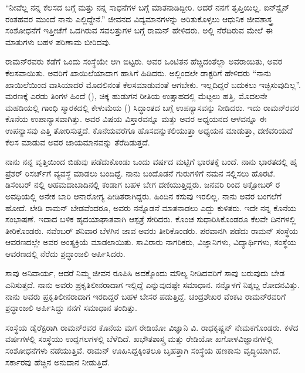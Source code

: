  “ನೀವೆಲ್ಲ ನನ್ನ ಕೆಲಸದ ಬಗ್ಗೆ ಮತ್ತು ನನ್ನ ಸಾಧನೆಗಳ ಬಗ್ಗೆ ಮಾತನಾಡಿದ್ದೀರಿ. ಆದರೆ ನನಗೆ ತೃಪ್ತಿಯಿಲ್ಲ. ಐನ್‍ಸ್ಟೈನ್ ರಂತಹವರ ಮುಂದೆ ನಾನು ಎಲ್ಲಿದ್ದೇನೆ.” ಜೀವನದ ವಿದ್ಯಮಾನಗಳನ್ನು ಅರಿತುಕೊಳ್ಳಲು ಆಧುನಿಕ ಜೀವಶಾಸ್ತ್ರ ಸಂಶೋಧನೆಗೆ ಇತ್ತೀಚೆಗೆ ಒದಗಿರುವ ಸವಲತ್ತುಗಳ ಬಗ್ಗೆ ರಾಮನ್ ಹೇಳಿದರು. ಅಲ್ಲಿ ನೆರೆದಿರುವ ಮೇಲೆ ಈ ಮಾತುಗಳು ಬಹಳ ಪರಿಣಾಮ ಬೀರಿದವು.

ರಾಮನ್‍ರವರು ಕಡೆಗೆ ಒಂದು ಸಂಸ್ಥೆಯೇ ಆಗಿ ಬಿಟ್ಟರು. ಅವರ ಒಂಟಿತನ ಹೆಚ್ಚಿದಂತೆಲ್ಲಾ ಅವರಾಯಿತು, ಅವರ ಕೆಲಸವಾಯಿತು. ಅವರಿಗೆ ಖಾಯಿಲೆಯಾದಾಗ ಹಾಸಿಗೆ ಹಿಡಿದರು. ಅಲ್ಲಿಂದಲೇ ಡಾಕ್ಟರಿಗೆ ಹೇಳಿದರು\enginline{-} “ನಾನು ಖಾಯಿಲೆಯಿಂದ ವಾಸಿಯಾದರೆ ಮೊದಲಿನಂತೆ ಕೆಲಸಮಾಡುವಂತೆ ಆಗಬೇಕು. ಇಲ್ಲದಿದ್ದರೆ ಬದುಕಲು ಇಚ್ಛಿಸುವುದಿಲ್ಲ”. ಮರಣಕ್ಕೆ ಎರಡು ತಿಂಗಳ ಹಿಂದೆ (), ಚಿಕ್ಕ ಹುಡುಗನ ರೀತಿಯ ಉತ್ಸಾಹದಲ್ಲಿ ಮೆಟ್ಟಲು ಹತ್ತಿ, ಮೊದಲನೇ ಮಹಡಿಯಲ್ಲಿ ಗಾಂಧಿ ಸ್ಮಾರಕದಲ್ಲಿ ಕೇಳುಮೆಯ () ಸಿದ್ಧಾಂತದ ಬಗ್ಗೆ ಉಪನ್ಯಾಸವನ್ನು ನೀಡಿದರು. ಇದು ರಾಮನ್‍ರವರ ಕೊನೆಯ ಉಪಾನ್ಯಾಸವಾಗಿತ್ತು. ಅವರ ವಿಷಯ ವಿಸ್ತಾರವನ್ನೂ ಮತ್ತು ಅವರ ಅಧ್ಯಯನದ ಆಳವನ್ನೂ ಈ ಉಪನ್ಯಾಸವು ಎತ್ತಿ ತೋರಿಸುತ್ತದೆ. ಕೊನೆಯವರೆಗೂ ಹೊಸದನ್ನು\break ಕಲಿಯುತ್ತಾ ಅಧ್ಯಯನ ಮಾಡುತ್ತಾ, ದಣಿವರಿಯದೆ ಕೆಲಸ ಮಾಡುವ ಅವರ ಜಾಯಮಾನವನ್ನು ತೆರೆದಿಡುತ್ತದೆ.

ನಾನು ನನ್ನ ವೃತ್ತಿಯಿಂದ ಬಿಡುವು ಪಡೆದುಕೊಂಡು ಒಂದು ವರ್ಷದ ಮಟ್ಟಿಗೆ ಭಾರತಕ್ಕೆ ಬಂದೆ. ನಾನು ಭಾರತದಲ್ಲಿ ಹೈ ಪ್ರೆಶರ್ ರಿಸರ್ಚ್‌ಗೆ ವ್ಯವಸ್ಥೆ ಮಾಡಲು ಬಂದಿದ್ದೆ. ನಾನು ಬಂದೊಡನೆ ಗುರುಗಳಿಗೆ ನಮನ ಸಲ್ಲಿಸಲು ಹೊರಟೆ.  ಡಿಸೆಂಬರ್ ನಲ್ಲಿ ಅಹಮದಾಬಾದಿನಲ್ಲಿ ಕಂಡಾಗ ಬಹಳ ಬೇಗ ದಣಿಯುತ್ತಿದ್ದರು. ಜನವರಿ  ರಿಂದ ಅಕ್ಟೋಬರ್  ರ ಅವಧಿಯಲ್ಲಿ ಅನೇಕ ಬಾರಿ ಆನಾರೋಗ್ಯ ಪೀಡಿತರಾಗಿದ್ದರು. ಹಿಂದಿನ ಕಸುವು ಇರಲಿಲ್ಲ. ನಾನು ಅವರ ಬಂಗಲೆಗೆ ಹೋದೆ. ಲೇಡಿ ರಾಮನ್ ಬೇಡವೆಂದರೂ, ಅವರು ನನ್ನೊಡನೆ ಮಾತನಾಡಲು ಎದ್ದು ಕುಳಿತರು. ಇದೇ ನನ್ನ ಕೊನೆಯ ಸಂಭಾಷಣೆ. ಇದಾದ ಬಳಿಕ ಹೃದಯಾಘಾತವಾಗಿ ಆಸ್ಪತ್ರೆ ಸೇರಿದರು. ಕೊಂಚ ಸುಧಾರಿಸಿಕೊಂಡರೂ ಕೆಲವೇ ದಿನಗಳಲ್ಲಿ ತೀರಿಕೊಂಡರು. ನವೆಂಬರ್  ಶನಿವಾರ ಬೆಳಗಿನ ಜಾವ ಅವರು ತೀರಿಕೊಂಡರು. ಪರವಾನಗಿ ಪಡೆದು ರಾಮನ್ ಸಂಸ್ಥೆಯ ಆವರಣದಲ್ಲೇ ಅವರ ಅಂತ್ಯಕ್ರಿಯೆ ಮಾಡಲಾಯಿತು. ಸಾವಿರಾರು ನಾಗರಿಕರು, ವಿಜ್ಞಾನಿಗಳು, ವಿದ್ಯಾರ್ಥಿಗಳು, ಸಂಸ್ಥೆಯ ಆವರಣದಲ್ಲಿ ನೆರೆದು ಶ್ರದ್ಧಾಂಜಲಿ ಅರ್ಪಿಸಿದರು.

ಸಾವು ಅನಿವಾರ್ಯ, ಆದರೆ ನಿಮ್ಮ ಜೀವನ ರೂಪಿಸಿ ಅದಕ್ಕೊಂದು ಮೌಲ್ಯ ನೀಡಿದವರಿಗೆ ಸಾವು ಬರುವುದು ಬೇಡ ಎನಿಸುತ್ತದೆ. ನಾನು ಅವರು ಪ್ರಕೃತಿಲೀನರಾದಾಗ ಇಲ್ಲಿದ್ದೆ ಎನ್ನುವುದಷ್ಟೇ ಸಮಾಧಾನ. ನನ್ನೊಳಗೆ ನಿಶ್ಶಬ್ದ ರೋದನವಿತ್ತು. ನಾನು ಅವರು ಪ್ರಕೃತಿಲೀನರಾದಾಗ ಇರದಿದ್ದರೆ ಬಹಳ ಬೇಸರ ಪಡುತ್ತಿದ್ದೆ. ಚಂದ್ರಶೇಖರ ವೆಂಕಟ ರಾಮನ್‍ರವರಿಗೆ ಶ್ರದ್ಧಾಂಜಲಿ ಅರ್ಪಿಸಿದ್ದು ನನಗೆ ಸಮಾಧಾನ ತಂದಿತ್ತು.

ಸಂಸ್ಥೆಯ ಡೈರೆಕ್ಟರಾಗಿ ರಾಮನ್‍ರವರ ಕೊನೆಯ ಮಗ ರೇಡಿಯೋ ವಿಜ್ಞಾನಿ ವಿ. ರಾಧಕೃಷ್ಣನ್ ನೇಮಕಗೊಂಡರು. ಕಳೆದ  ವರ್ಷಗಳಲ್ಲಿ ಸಂಸ್ಥೆಯು ಉದ್ದಗಲಗಳಲ್ಲಿ ಬೆಳೆದಿದೆ. ಖಭೌತಶಾಸ್ತ್ರ ಮತ್ತು ರೇಡಿಯೋ ಖಗೋಳವಿಜ್ಞಾನಗಳಲ್ಲಿ ಸಂಶೋಧನೆಗಳು ನಡೆಯುತ್ತಿವೆ. ರಾಮನ್ ಊಹಿಸಿದ್ದಕ್ಕಿಂತಲೂ ಬೃಹತ್ತಾಗಿ ಸಂಸ್ಥೆಯ ಹಣಕಾಸು ವೃದ್ಧಿಯಾಗಿದೆ. ಸರ್ಕಾರವು ಹೆಚ್ಚಿನ ಅನುದಾನ ನೀಡುತ್ತಿದೆ.

